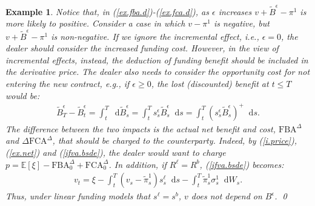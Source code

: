 \documentclass[a4paper, 11pt]{article}              %
\numberwithin{equation}{section}
\theoremstyle{plain}
\newcommand{\FBAd}{\text{FBA}^\Delta}
\newcommand{\FCAd}{\text{FCA}^\Delta}
\newcommand{\1}{\mathds{1}}
\newcommand{\Bt}{\tilde{B}}
\newcommand{\pit}{\tilde{\pi}}
\newcommand{\dsE}{\mathbb{E}}
\theoremstyle{plain}
\theoremstyle{definition}
\newtheorem{example}[thm]{Example}
\theoremstyle{plain}
\newtheorem{example}{Example}
\newcommand*\df{\mathop{}\!\mathrm{d}}
\begin{document}
\begin{example}
Notice that, in (\ref{ex.fba.d})-(\ref{ex.fca.d}), as $\epsilon$ increases
$v +\Bt^\epsilon -\pi^1$ is more likely to positive. Consider a case in which 
$v -\pi^1$ is negative, but $v +\Bt^\epsilon -\pi^1$ is non-negative. If we ignore the
incremental effect, i.e., $\epsilon=0$, the dealer should consider the increased
funding cost. However, in the view of incremental effects, instead, the
deduction of funding benefit should be included in the derivative
price. The dealer also needs to consider the opportunity cost for not
entering the new contract, e.g., if $\epsilon \geq0$, the lost (discounted) benefit at
$t \leq T$ would be:
\begin{align}
  \Bt^\epsilon_T -\Bt^\epsilon_t=\int_{t}^{T} \df \Bt^\epsilon_s  =\int_{t}^{T} s^\epsilon_s\Bt^\epsilon_s\df s=\int_{t}^{T} (s^\epsilon_s\Bt^\epsilon_s)^+\df s.
\end{align}
The difference between the
two impacts is the actual net benefit and cost, $\text{FBA}^\Delta$ and
$\Delta \text{FCA}^\Delta$, that should be charged to the counterparty. Indeed, by
(\ref{i.price}), (\ref{ex.net}) and (\ref{ifva.bsde}), the dealer would want to charge
 $ p = \dsE[\xi] - \FBAd_0 +  \FCAd_0$. 
In addition, if $R^\ell=R^b$, (\ref{ifva.bsde}) becomes:
\begin{align}
  v_t = \xi - \int_{t}^{T}(v_s - \pit^1_s)s^\ell_s
  \df s  -\int_{t}^{T} \pit^1_s  \sigma^1_s \df W_s. 
\end{align}
Thus, under linear funding models that $s^\ell = s^b$, $v$ does not depend on
$B^\epsilon$.  \qed
\end{example}
\end{document}
